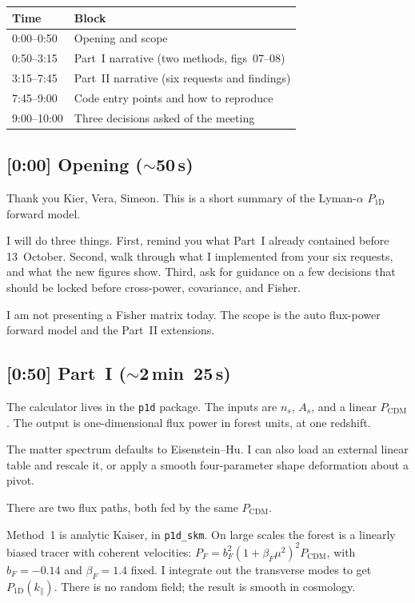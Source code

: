 \documentclass[11pt]{article}
\begin{document}
\begin{center}
\small
\begin{tabular}{@{}p{}p{}@{}}
\toprule
Time & Block \\
\midrule
0:00--0:50 & Opening and scope \\
0:50--3:15 & Part~I narrative (two methods, figs~07--08) \\
3:15--7:45 & Part~II narrative (six requests and findings) \\
7:45--9:00 & Code entry points and how to reproduce \\
9:00--10:00 & Three decisions asked of the meeting \\
\bottomrule
\end{tabular}
\end{center}

\subsection*{[0:00] Opening ($\sim$50\,s)}

Thank you Kier, Vera, Simeon.
This is a short summary of the Lyman-$\alpha$ $P_{1\mathrm{D}}$ forward model.

I will do three things.
First, remind you what Part~I already contained before 13~October.
Second, walk through what I implemented from your six requests, and what the new figures show.
Third, ask for guidance on a few decisions that should be locked before cross-power, covariance, and Fisher.

I am not presenting a Fisher matrix today.
The scope is the auto flux-power forward model and the Part~II extensions.

\subsection*{[0:50] Part~I ($\sim$2\,min~25\,s)}

The calculator lives in the \texttt{p1d} package.
The inputs are $n_s$, $A_s$, and a linear $P_\mathrm{CDM}$.
The output is one-dimensional flux power in forest units, at one redshift.

The matter spectrum defaults to Eisenstein--Hu.
I can also load an external linear table and rescale it, or apply a smooth four-parameter shape deformation about a pivot.

There are two flux paths, both fed by the same $P_\mathrm{CDM}$.

Method~1 is analytic Kaiser, in \texttt{p1d\_skm}.
On large scales the forest is a linearly biased tracer with coherent velocities:
$P_F=b_F^{2}(1+\beta_F\mu^{2})^{2}P_\mathrm{CDM}$, with $b_F=-0.14$ and $\beta_F=1.4$ fixed.
I integrate out the transverse modes to get $P_{1\mathrm{D}}(k_\parallel)$.
There is no random field; the result is smooth in cosmology.
\end{document}
